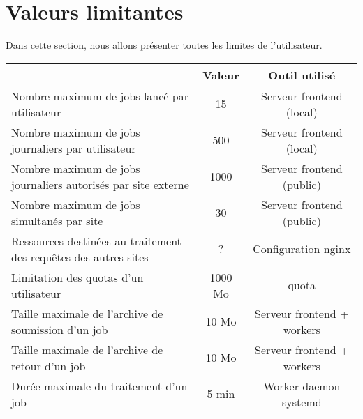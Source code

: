 \section{Valeurs limitantes}

Dans cette section, nous allons présenter toutes les limites de l'utilisateur.


\begin{center}
	\begin{tabular}{| L{8cm} | c | c |}
		\hline
		  & {\bf Valeur} & {\bf Outil utilisé} \\ \hline
		Nombre maximum de jobs lancé par utilisateur & 15 & Serveur frontend (local) \\ \hline %
		Nombre maximum de jobs journaliers par utilisateur & 500 & Serveur frontend (local) \\ \hline %
		Nombre maximum de jobs journaliers autorisés par site externe & 1000 & Serveur frontend (public) \\ \hline %
		Nombre maximum de jobs simultanés par site & 30 & Serveur frontend (public) \\ \hline %
		Ressources destinées au traitement des requêtes des autres sites & ? & Configuration nginx \\ \hline %
		Limitation des quotas d'un utilisateur & 1000 Mo & quota \\ \hline %
		Taille maximale de l'archive de soumission d'un job & 10 Mo & Serveur frontend + workers \\ \hline %
		Taille maximale de l'archive de retour d'un job & 10 Mo & Serveur frontend + workers \\ \hline %
		Durée maximale du traitement d'un job & 5 min & Worker daemon systemd \\ \hline %

\end{tabular}
\end{center}
